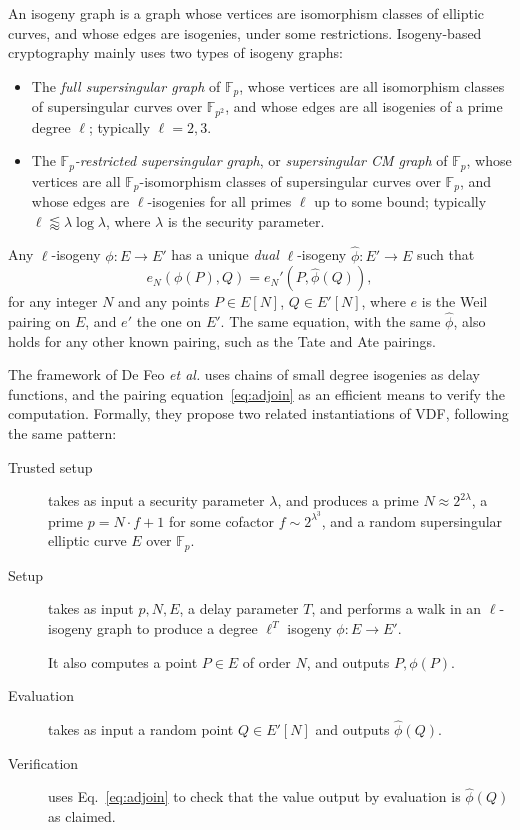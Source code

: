 \documentclass{llncs}
\newcommand{\F}{\mathbb{F}}
\begin{document}
An isogeny graph is a graph whose vertices are isomorphism classes of
elliptic curves, and whose edges are isogenies, under some
restrictions. %
Isogeny-based cryptography mainly uses two types of isogeny graphs:
\begin{itemize}
\item The \emph{full supersingular graph} of $\F_p$, whose vertices
  are all isomorphism classes of supersingular curves over $\F_{p^2}$,
  and whose edges are all isogenies of a prime degree $\ell$;
  typically $\ell=2,3$.
\item The \emph{$\F_p$-restricted supersingular graph}, or
  \emph{supersingular CM graph} of $\F_p$, whose vertices are all
  $\F_p$-isomorphism classes of supersingular curves over $\F_p$, and
  whose edges are $\ell$-isogenies for all primes $\ell$ up to some
  bound; typically $\ell\lessapprox\lambda\log\lambda$, where
  $\lambda$ is the security parameter.
\end{itemize}

Any $\ell$-isogeny $\phi:E\to E'$ has a unique \emph{dual}
$\ell$-isogeny $\hat\phi:E'\to E$ such that
\begin{equation}
  \label{eq:adjoin}
  e_N(\phi(P),Q) = e_N'(P,\hat\phi(Q)),
\end{equation}
for any integer $N$ and any points $P\in E[N]$, $Q\in E'[N]$, where
$e$ is the Weil pairing on $E$, and $e'$ the one on $E'$. %
The same equation, with the same $\hat\phi$, also holds for any other
known pairing, such as the Tate and Ate pairings.

The framework of De Feo \emph{et al.} uses chains of small degree
isogenies as delay functions, and the pairing
equation~\eqref{eq:adjoin} as an efficient means to verify the
computation. %
Formally, they propose two related instantiations of VDF, following
the same pattern:
%
\begin{description}
\item[Trusted setup] takes as input a security parameter $\lambda$,
  and produces a prime $N\approx 2^{2\lambda}$, a prime $p=N\cdot f+1$
  for some cofactor $f\sim 2^{\lambda^3}$, and a random supersingular
  elliptic curve $E$ over $\F_p$.
\item[Setup] takes as input $p,N,E$, a delay parameter $T$, and
  performs a walk in an $\ell$-isogeny graph to produce a degree
  $\ell^T$ isogeny $\phi:E\to E'$.
  
  It also computes a point $P\in E$ of order $N$, and outputs
  $P,\phi(P)$.
\item[Evaluation] takes as input a random point $Q\in E'[N]$ and outputs
  $\hat\phi(Q)$.
\item[Verification] uses Eq.~\eqref{eq:adjoin} to check that the value
  output by evaluation is $\hat\phi(Q)$ as claimed.
\end{description}
\end{document}
